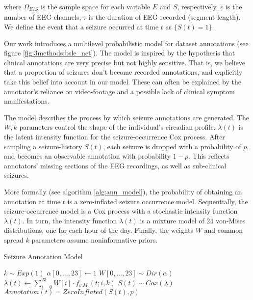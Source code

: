 where $\Omega_{E/S}$ is the sample space for each variable $E$ and $S$, respectively. $c$ is the number of EEG-channels, $\tau$ is the duration of EEG recorded (\aka segment length). We define the event that a seizure occurred at time $t$ as $\{S(t) = 1\}$.

Our work introduces a multilevel probabilistic model for dataset annotations (see figure \ref{fig:3methods:bsle_net}). The model is inspired by the hypothesis that clinical annotations are very precise but not highly sensitive. That is, we believe that a proportion of seizures don't become recorded annotations, and explicitly take this belief into account in our model. These can often be explained by the annotator's reliance on video-footage and a possible lack of clinical symptom manifestations.



The model describes the process by which seizure annotations are generated. The $W, k$ parameters control the shape of the individual's circadian profile. $\lambda(t)$ is the latent intensity function for the seizure-occurrence Cox process. After sampling a seizure-history $S(t)$, each seizure is dropped with a probability of $p$, and becomes an observable annotation with probability $1-p$. This reflects annotators' missing sections of the EEG recordings, as well as sub-clinical seizures.

More formally (see algorithm \ref{alg:ann_model}), the probability of obtaining an annotation at time $t$ is a zero-inflated seizure occurrence model. Sequentially, the seizure-occurrence model is a Cox process with a stochastic intensity function $\lambda(t)$. In turn, the intensity function $\lambda(t)$ is a mixture model of 24 von-Mises distributions, one for each hour of the day. Finally, the weights $W$ and common spread $k$ parameters assume noninformative priors.



\begin{algorithm}
\caption{Seizure Annotation Model}
\label{alg:ann_model}
\begin{algorithmic}
\State $k \sim Exp(1)$
\State $\alpha[0,...,23] \gets 1$
\State $W[0,...,23] \sim Dir(\alpha)$
\State $\lambda(t) \gets \sum_{i=0}^{23} W[i] \cdot f_{v.M.}(t; i, k)$
\State $S(t) \sim Cox(\lambda)$
\State $Annotation(t) = ZeroInflated(S(t), p)$
\end{algorithmic}
\end{algorithm}

